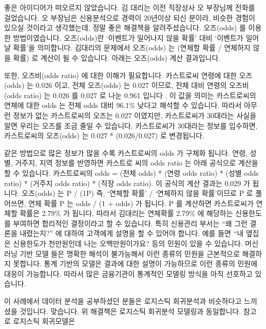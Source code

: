 \documentclass[letterpaper,10pt,english]{jupyterBook}
\begin{document}
\sphinxAtStartPar


\sphinxAtStartPar
좋은 아이디어가 떠오르지 않았습니다. 김 대리는 이전 직장상사 오 부장님께 전화를 걸었습니다. 오 부장님은 신용분석으로 경력이 20년이상 되신 분이라, 비슷한 경험이 있으실 것이라고 생각했는데, 정말 좋은 해결책을 알려주셨습니다. 오즈(odds) 를 이용한 방법이였습니다. 오즈(odds)란 ‘이벤트가 일어나지 않을 확률’ 대비 ‘이벤트가 일어날 확률’을 의미합니다. 김대리의 문제에서 오즈(odds) 는 (연체할 확률 / 연체하지 않을 확률) 로 계산이 될 수 있습니다. 아래는 오즈(odds) 계산 결과입니다.

\sphinxAtStartPar


\sphinxAtStartPar
또한, 오즈비(odds ratio) 에 대한 이해가 필요합니다. 카스트로씨 연령에 대한 오즈(odds) 는 0.026 이고, 전체 오즈(odds) 는 0.027 이므로, 전체 대비 연령의 오즈비(odds ratio) 는 0.026 를 0.027 로 나눈 0.961 입니다 . 이 값을 의미는 카스트로씨의 연체에 대한 odds 는 전체 odds 대비 96.1\% 낮다고 해석할 수 있습니다. 따라서 아무런 정보가 없는 카스트로씨의 오즈는 0.027 이였지만, 카스트로씨가 30대라는 사실을 알면 우리는 오즈를 조금 줄일 수 있습니다. 카스트로씨가 30대라는 정보를 입수하면, 카스트로씨의 오즈(odds) 는 0.027 * (0.026/0.027) 로 변경됩니다.

\sphinxAtStartPar
같은 방법으로 많은 정보가 많을 수록 카스트로씨의  odds 가 구체화 됩니다. 연령, 성별, 거주지, 지역 정보를 반영하면 카스트로 씨의 odds ratio 는 아래 공식으로 계산을 할 수 있습니다. 카스트로씨의 odds = (전체 odds) * (연령 odds ratio) * (성별 odds ratio) * (거주지 odds ratio) * (직장 odds ratio). 이 공식의 계산 결과는 0.029 가 됩니다. 오즈(odds) 는 P / (1\sphinxhyphen{}P)  즉, ‘연체할 확률’ / ‘연체하지 않을 확률’이므로 P 로 풀어쓰면, 연체 확률 P 는 odds / (1 + odds) 가 됩니다. P 를 계산하면 카스트로씨가 연체할 확률은 2.79\% 가 됩니다. 따라서 김대리는 연체확률 2.79\% 에 해당하는 신용한도를 부여하면 합리적인 결정이라고 할 수 있습니다. 특히 신용관리 부서는 “왜 그런 결론을 내렸는지?” 에 대하여 고객에게 설명을 할 수 있어야 합니다. 예를 들면 “내 옆집은 신용한도가 천만원인데 나는 오백만원이가요? 등의 민원이 있을 수 있습니다. 머신러닝 기반 모델 들은 명확한 해석이 불가능해서 이런 종류의 민원을 근본적으로 해결하지 못합니다. 통계 기반의 모델은 결과에 대한 설명이 가능하므로 이런 종류의 민원에 대응이 가능합니다. 따라서 많은 금융기관이 통계적인 모델링 방식을 아직 선호하고 있습니다.

\sphinxAtStartPar
이 사례에서 데이터 분석을 공부하셨던 분들은 로지스틱 회귀분석과 비슷하다고 느끼 셨을 것입니다. 맞습니다. 위 해결책은 로지스틱 회귀분석 모델링과 동일합니다.
참고로 로지스틱 회귀모델은
\end{document}
